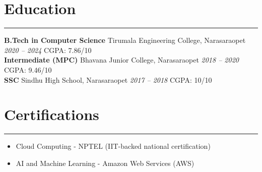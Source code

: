 \documentclass[10pt]{article}
\begin{document}
\section*{Education}
\vspace{1pt}\hrule\vspace{4pt}
\textbf{B.Tech in Computer Science} \textbullet{} Tirumala Engineering College, Narasaraopet \hfill \textit{2020 -- 2024} \quad CGPA: 7.86/10 \\[1pt]
\textbf{Intermediate (MPC)} \textbullet{} Bhavana Junior College, Narasaraopet \hfill \textit{2018 -- 2020} \quad CGPA: 9.46/10 \\[1pt]
\textbf{SSC} \textbullet{} Sindhu High School, Narasaraopet \hfill \textit{2017 -- 2018} \quad CGPA: 10/10

\section*{Certifications}
\vspace{1pt}\hrule\vspace{4pt}
\begin{itemize}
  \item Cloud Computing - NPTEL (IIT-backed national certification)
  \item AI and Machine Learning - Amazon Web Services (AWS)
\end{itemize}
\end{document}

